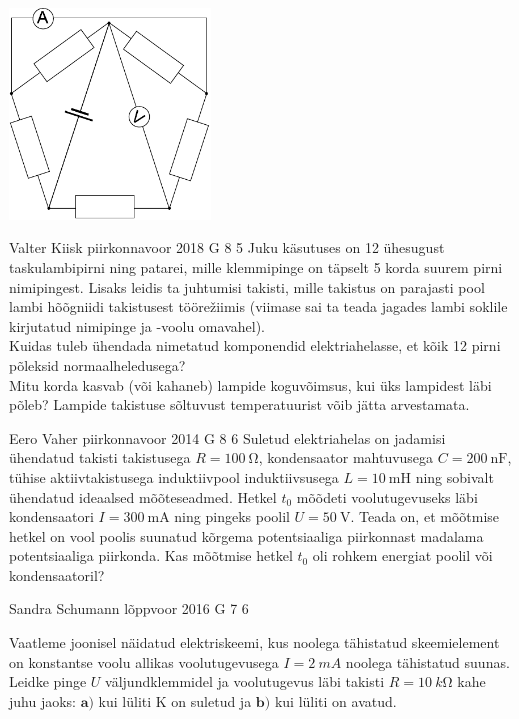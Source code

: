 \documentclass[11pt]{article}
\begin{document}
{{\begin{center}
	\includegraphics[width=0.4\textwidth]{2017-v3g-06-viisnurk}
\end{center}
\fi
}

{Valter Kiisk} %
{piirkonnavoor} %
{2018} %
{G 8} %
{5} %
{
\ifStatement
Juku käsutuses on 12 ühesugust taskulambipirni ning patarei, mille klemmipinge on täpselt 5 korda suurem pirni nimipingest. Lisaks leidis ta juhtumisi takisti, mille takistus on parajasti pool lambi hõõgniidi takistusest töörežiimis (viimase sai ta teada jagades lambi soklile kirjutatud nimipinge ja -voolu omavahel).\\
\osa Kuidas tuleb ühendada nimetatud komponendid elektriahelasse, et kõik 12 pirni põleksid normaalheledusega?\\
\osa Mitu korda kasvab (või kahaneb) lampide koguvõimsus, kui üks lampidest läbi põleb? Lampide takistuse sõltuvust temperatuurist võib jätta arvestamata.
\fi
}

{Eero Vaher} %
{piirkonnavoor} %
{2014} %
{G 8} %
{6} %
{
\ifStatement
Suletud elektriahelas on jadamisi ühendatud takisti takistusega $R=\SI{100}{\ohm}$, kondensaator mahtuvusega $C=\SI{200}{\nano\farad}$, tühise aktiivtakistusega induktiivpool induktiivsusega $L=\SI{10}{\milli\henry}$ ning sobivalt ühendatud ideaalsed mõõteseadmed. Hetkel $t_0$ mõõdeti voolutugevuseks läbi kondensaatori $I=\SI{300}{\milli\ampere}$ ning pingeks poolil $U=\SI{50}{\volt}$. Teada on, et mõõtmise hetkel on vool poolis suunatud kõrgema potentsiaaliga piirkonnast madalama potentsiaaliga piirkonda. Kas mõõtmise hetkel $t_0$ oli rohkem energiat poolil või kondensaatoril? 
\fi
}

{Sandra Schumann} %
{lõppvoor} %
{2016} %
{G 7} %
{6} %
{
\ifStatement
Vaatleme joonisel näidatud elektriskeemi, kus noolega tähistatud skeemielement on konstantse voolu allikas voolutugevusega $I=\SI{2}{mA}$ noolega tähistatud suunas. Leidke pinge $U$ väljundklemmidel ja voolutugevus läbi takisti $R=\SI{10}{k\ohm}$ kahe juhu jaoks: $\textbf{a)}$ kui lüliti K on suletud ja $\textbf{b)}$ kui lüliti on avatud.

}}
\end{document}
